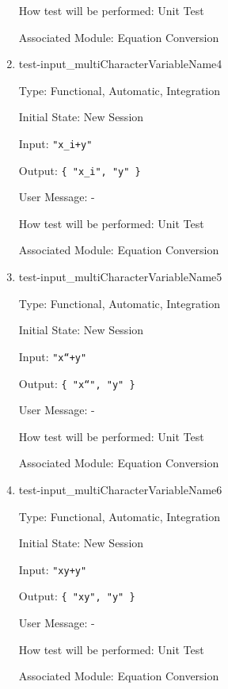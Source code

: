 \documentclass[12pt, titlepage]{article}
\begin{document}
\begin{enumerate}
	How test will be performed: Unit Test
	
	Associated Module: Equation Conversion\\
	
	\item{test-input\_multiCharacterVariableName4}
	
	Type: Functional, Automatic, Integration
	
	Initial State: New Session
	
	Input: \texttt{"x\_i+y"}
	
	Output: \texttt{\{ "x\_i", "y" \}}
	
	User Message: - 
	
	How test will be performed: Unit Test
	
	Associated Module: Equation Conversion\\
	
	\item{test-input\_multiCharacterVariableName5}
	
	Type: Functional, Automatic, Integration
	
	Initial State: New Session
	
	Input: \texttt{"x``+y"}
	
	Output: \texttt{\{ "x``", "y" \}}
	
	User Message: - 
	
	How test will be performed: Unit Test
	
	Associated Module: Equation Conversion\\
	
	\item{test-input\_multiCharacterVariableName6}
	
	Type: Functional, Automatic, Integration
	
	Initial State: New Session
	
	Input: \texttt{"xy+y"}
	
	Output: \texttt{\{ "xy", "y" \}}
	
	User Message: - 
	
	How test will be performed: Unit Test
	
	Associated Module: Equation Conversion\\
	
%	
%	
%	
%	
%	
%	
	
\end{enumerate}
\end{document}
